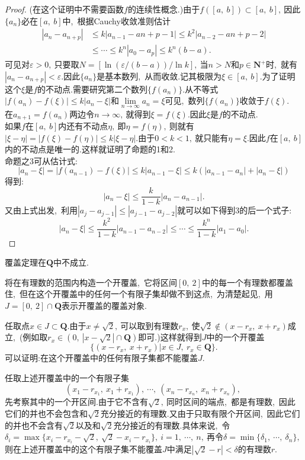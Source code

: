 \begin{proof}
	(在这个证明中不需要函数$f$的连续性概念.)由于$f([a,\ b])\subset[a,\ b],\ $因此$\{a_n\}$必在$[a,\ b]$中,\ 根据Cauchy收敛准则估计
	$$\begin{aligned}
		|a_n-a_{n+p}|&\leqslant k|a_{n-1}-a{n+p-1}|\leqslant k^2|a_{n-2}-a{n+p-2}|\\
		&\leqslant\cdots\leqslant k^n|a_0-a_p|\leqslant k^n(b-a).
	\end{aligned}$$
	可见对$\varepsilon>0,\ $只要取$N=[\ln(\varepsilon/(b-a))/\ln k],\ $当$n>N$和$p\in\mathbf{N}^+$时,\ 就有$|a_n-a_{n+p}|<\varepsilon.$因此$\{a_n\}$是基本数列,\ 从而收敛.记其极限为$\xi\in[a,\ b].$为了证明这个$\xi$是$f$的不动点.需要研究第二个数列$\{f(a_n)\}.$从不等式$|f(a_n)-f(\xi)|\leqslant k|a_n-\xi|$和$\lim\limits_{n\rightarrow\infty}a_n=\xi$可见,\ 数列$\{f(a_n)\}$收敛于$f(\xi).$\\
	在$a_{n+1}=f(a_n)$两边令$n\rightarrow\infty,\ $就得到$\xi=f(\xi).$因此$\xi$是$f$的不动点.\\
	如果$f$在$[a,\ b]$内还有不动点$\eta,\ $即$\eta=f(\eta),\ $则就有$|\xi-\eta|=|f(\xi)-f(\eta)|\leqslant k|\xi-\eta|.$由于$0<k<1,\ $就只能有$\eta=\xi.$因此$f$在$[a,\ b]$内的不动点是唯一的.这样就证明了命题的1和2.\\
	命题之3可从估计式:
	$$|a_n-\xi|=|f(a_{n-1})-f(\xi)|\leqslant k|a_{n-1}-\xi|\leqslant k(|a_{n-1}-a_n|+|a_n-\xi|)$$
	得到:
	$$|a_n-\xi|\leqslant\frac{k}{1-k}|a_n-a_{n-1}|.$$
	又由上式出发,\ 利用$|a_j-a_{j-1}|\leqslant|a_{j-1}-a_{j-2}|$就可以如下得到3的后一个式子:
	$$|a_n-\xi|\leqslant \frac{k^2}{1-k}|a_{n-1}-a_{n-2}|\leqslant\cdots\leqslant\frac{k^n}{1-k}|a_1-a_0|.$$
\end{proof}
\newpage
\begin{example}
	覆盖定理在$\mathbf Q$中不成立.
\end{example}
\begin{solution}
	将在有理数的范围内构造一个开覆盖,\ 它将区间$[0,\ 2]$中的每一个有理数都覆盖住,\ 但在这个开覆盖中的任何一个有限子集却做不到这点,\ 为清楚起见,\ 用$J=[0,\ 2]\cap\mathbf Q$表示开覆盖的覆盖对象.
	
	任取点$x\in J\subset\mathbf Q.$由于$x\neq\sqrt{2},\ $可以取到有理数$r_x,\ $使$\sqrt{2}\notin(x-r_x,\ x+r_x)$成立,\ (例如取$r_x\in(0,\ |x-\sqrt{2}|\cap\mathbf{Q})$即可.)这样就得到$J$中的一个开覆盖
	$$\{(x-r_x,\ x+r_x)|x\in J,\ r_x\in \mathbf{Q}\}.$$
	可以证明:在这个开覆盖中的任何有限子集都不能覆盖$J.$
	
	任取上述开覆盖中的一个有限子集
	$$(x_1-r_{x_1},\ x_1+r_{x_1}),\ \cdots,\ (x_n-r_{x_n},\ x_n+r_{x_n}),\ $$
	先考察其中的一个开区间.由于它不含有$\sqrt{2},\ $同时区间的端点,\ 都是有理数,\ 因此它们的并也不会包含和$\sqrt{2}$充分接近的有理数.又由于只取有限个开区间,\ 因此它们的并也不会含有$\sqrt{2}$以及和$\sqrt{2}$充分接近的有理数.具体来说,\ 令$\delta_i=\max\{x_i-r_{x_i}-\sqrt{2},\ \sqrt{2}-x_i-r_{x_i}\},\ i=1,\ \cdots,\ n,\ $再令$\delta=\min\{\delta_1,\ \cdots,\ \delta_n\},\ $则在上述开覆盖中的这个有限子集不能覆盖$J$中满足$|\sqrt{2}-r|<\delta$的有理数$r.$
\end{solution}
